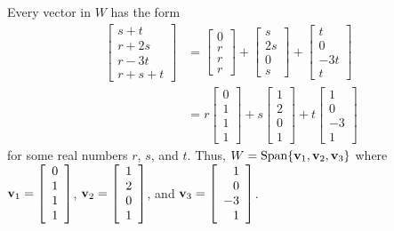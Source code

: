 \begin{example}
\ExampleSolution 
\ba
\item Every vector in $W$ has the form
\begin{align*}
\left[ \begin{array}{c} s+t \\ r+2s \\ r-3t \\ r+s+t \end{array} \right] &= \left[ \begin{array}{c} 0 \\ r \\ r \\ r\end{array} \right] + \left[ \begin{array}{c} s \\ 2s \\ 0 \\ s \end{array} \right] + \left[ \begin{array}{r} t \\ 0 \\ -3t \\ t \end{array} \right] \\
	&= r\left[ \begin{array}{c} 0 \\ 1 \\ 1 \\ 1 \end{array} \right] + s\left[ \begin{array}{r} 1 \\ 2 \\ 0 \\ 1 \end{array} \right] + t\left[ \begin{array}{r} 1 \\ 0 \\ -3 \\ 1 \end{array} \right]
\end{align*}
for some real numbers $r$, $s$, and $t$. Thus, $W = \text{Span}\{\mathbf{v}_1, \mathbf{v}_2, \mathbf{v}_3\}$ where $\mathbf{v}_1 = \left[ \begin{array}{c} 0 \\ 1 \\ 1 \\ 1 \end{array} \right]$, $\mathbf{v}_2 = \left[ \begin{array}{r} 1 \\ 2 \\ 0 \\ 1 \end{array} \right]$, and $\mathbf{v}_3 = \left[ \begin{array}{r} 1 \\ 0 \\ -3 \\ 1 \end{array} \right]$. 


\end{example}
